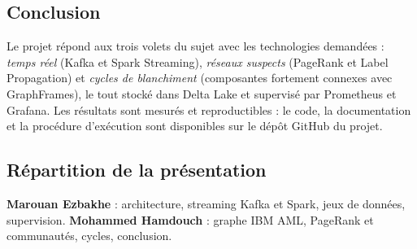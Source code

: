 \documentclass[11pt,a4paper]{article}
\begin{document}
\subsection{Conclusion}
Le projet r\'epond aux trois volets du sujet avec les technologies demand\'ees : \emph{temps r\'eel} (Kafka et Spark Streaming), \emph{r\'eseaux suspects} (PageRank et Label Propagation) et \emph{cycles de blanchiment} (composantes fortement connexes avec GraphFrames), le tout stock\'e dans Delta Lake et supervis\'e par Prometheus et Grafana. Les r\'esultats sont mesur\'es et reproductibles : le code, la documentation et la proc\'edure d'ex\'ecution sont disponibles sur le d\'ep\^ot GitHub du projet.

\subsection{R\'epartition de la pr\'esentation}
\textbf{Marouan Ezbakhe} : architecture, streaming Kafka et Spark, jeux de donn\'ees, supervision. \textbf{Mohammed Hamdouch} : graphe IBM AML, PageRank et communaut\'es, cycles, conclusion.
\end{document}
